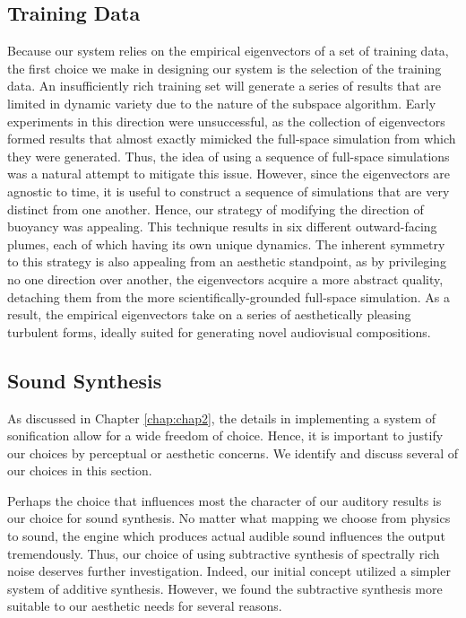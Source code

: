 \subsection{Training Data}
Because our system relies on the empirical eigenvectors of a set of training data, the first choice we make in designing our system is the selection of the training data. An insufficiently rich training set will generate a series of results that are limited in dynamic variety due to the nature of the subspace algorithm. Early experiments in this direction were unsuccessful, as the collection of eigenvectors formed results that almost exactly mimicked the full-space simulation from which they were generated. Thus, the idea of using a sequence of full-space simulations was a natural attempt to mitigate this issue. However, since the eigenvectors are agnostic to time, it is useful to construct a sequence of simulations that are very distinct from one another. Hence, our strategy of modifying the direction of buoyancy was appealing. This technique results in six different outward-facing plumes, each of which having its own unique dynamics. The inherent symmetry to this strategy is also appealing from an aesthetic standpoint, as by privileging no one direction over another, the eigenvectors acquire a more abstract quality, detaching them from the more scientifically-grounded full-space simulation. As a result, the empirical eigenvectors take on a series of aesthetically pleasing turbulent forms, ideally suited for generating novel audiovisual compositions.

\subsection{Sound Synthesis}
As discussed in Chapter \ref{chap:chap2}, the details in implementing a system of sonification allow for a wide freedom of choice. Hence, it is important to justify our choices by perceptual or aesthetic concerns. We identify and discuss several of our choices in this section.

Perhaps the choice that influences most the character of our auditory results is our choice for sound synthesis. No matter what mapping we choose from physics to sound, the engine which produces actual audible sound influences the output tremendously. Thus, our choice of using subtractive synthesis of spectrally rich noise deserves further investigation. Indeed, our initial concept utilized a simpler system of additive synthesis. However, we found the subtractive synthesis more suitable to our aesthetic needs for several reasons.

